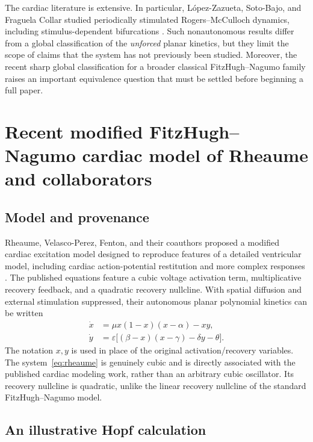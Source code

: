 \documentclass[11pt,a4paper]{article}
\begin{document}
The cardiac literature is extensive. In particular, L\'opez-Zazueta, Soto-Bajo, and Fraguela Collar studied periodically stimulated Rogers--McCulloch dynamics, including stimulus-dependent bifurcations \cite{LopezZazueta2024}. Such nonautonomous results differ from a global classification of the \emph{unforced} planar kinetics, but they limit the scope of claims that the system has not previously been studied. Moreover, the recent sharp global classification for a broader classical FitzHugh--Nagumo family \cite{ChenLiXiao2026} raises an important equivalence question that must be settled before beginning a full paper.

\section{Recent modified FitzHugh--Nagumo cardiac model of Rheaume and collaborators}
\label{sec:modified}

\subsection{Model and provenance}

Rheaume, Velasco-Perez, Fenton, and their coauthors proposed a modified cardiac excitation model designed to reproduce features of a detailed ventricular model, including cardiac action-potential restitution and more complex responses \cite{RheaumeEtAl2023}. The published equations feature a cubic voltage activation term, multiplicative recovery feedback, and a quadratic recovery nullcline. With spatial diffusion and external stimulation suppressed, their autonomous planar polynomial kinetics can be written
\begin{equation}
\boxed{\begin{aligned}
\dot x &=\mu x(1-x)(x-\alpha)-xy,\\
\dot y &=\varepsilon\bigl[(\beta-x)(x-\gamma)
                          -\delta y-\theta\bigr].
\end{aligned}}
\label{eq:rheaume}
\end{equation}
The notation $x,y$ is used in place of the original activation/recovery variables. The system~\eqref{eq:rheaume} is genuinely cubic and is directly associated with the published cardiac modeling work, rather than an arbitrary cubic oscillator. Its recovery nullcline is quadratic, unlike the linear recovery nullcline of the standard FitzHugh--Nagumo model.

\subsection{An illustrative Hopf calculation}
\end{document}
